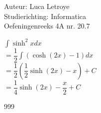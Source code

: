 \documentclass[a4paper]{article}
\begin{document}
  
\noindent \large Auteur: Luca Letroye \\
\noindent \large Studierichting: Informatica\\
\noindent \large Oefeningenreeks 4A nr. 20.7\\

\medskip
\normalsize

$\displaystyle\int \sinh^2 x dx$\\

$ = \dfrac{1}{2}\displaystyle\int (\cosh(2x) -1) dx$\\

$ = \dfrac{1}{2}\left(\dfrac{1}{2}\sinh(2x)-x \right)+C$\\

$ = \dfrac{1}{4}\sinh(2x) -\dfrac{x}{2}  +C$\\


\begin{thebibliography}{999}
\end{thebibliography}
\end{document}
